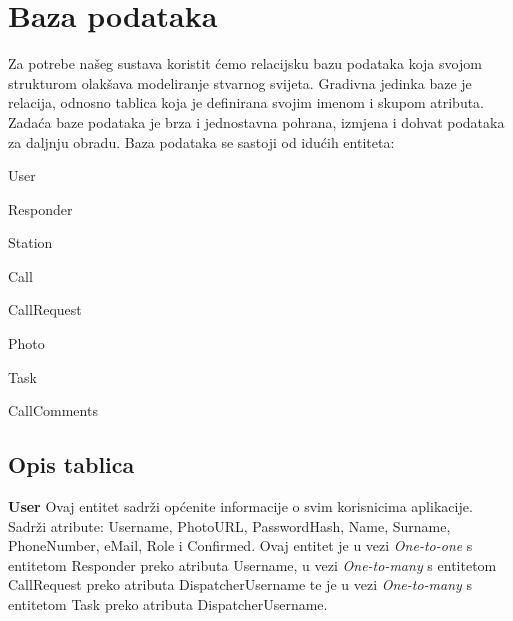 				
		\section{Baza podataka}
			
		\text Za potrebe našeg sustava koristit ćemo relacijsku bazu podataka koja svojom strukturom olakšava modeliranje stvarnog svijeta. Gradivna jedinka baze je relacija, odnosno tablica koja je definirana svojim imenom i skupom atributa. Zadaća baze podataka je brza i jednostavna pohrana, izmjena i dohvat podataka za daljnju obradu.
		\text Baza podataka se sastoji od idućih entiteta:
		\begin{packed_item}
			
			\item User
			\item Responder
			\item Station
			\item Call
			\item CallRequest
			\item Photo
			\item Task
			\item CallComments

		\end{packed_item}
		
			\subsection{Opis tablica}

				\textbf {User} \text Ovaj entitet sadrži općenite informacije o svim korisnicima aplikacije. Sadrži atribute: Username, PhotoURL, PasswordHash, Name, Surname, PhoneNumber, eMail, Role i Confirmed. Ovaj entitet je u vezi \textit{One-to-one} s entitetom Responder preko atributa Username, u vezi \textit{One-to-many} s entitetom CallRequest preko atributa DispatcherUsername te je u vezi \textit{One-to-many} s entitetom Task preko atributa DispatcherUsername. 
				
